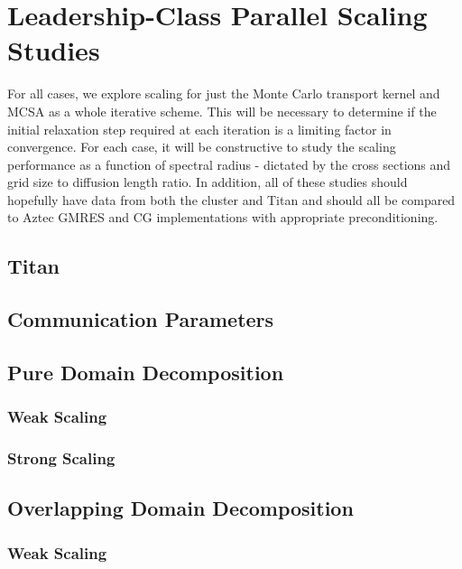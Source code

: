 \section{Leadership-Class Parallel Scaling Studies}
\label{sec:leadership_scaling_studies}
For all cases, we explore scaling for just the Monte Carlo transport
kernel and MCSA as a whole iterative scheme. This will be necessary to
determine if the initial relaxation step required at each iteration is
a limiting factor in convergence. For each case, it will be
constructive to study the scaling performance as a function of
spectral radius - dictated by the cross sections and grid size to
diffusion length ratio. In addition, all of these studies should
hopefully have data from both the cluster and Titan and should all be
compared to Aztec GMRES and CG implementations with appropriate
preconditioning.

\subsection{Titan}
\label{subsec:titan}

\subsection{Communication Parameters}
\label{subsec:comm_parameters}

\subsection{Pure Domain Decomposition}
\label{subsec:pure_domain_decomp}

\subsubsection{Weak Scaling}
\label{subsubsec:pure_weak}

\subsubsection{Strong Scaling}
\label{subsubsec:pure_strong}

\subsection{Overlapping Domain Decomposition}
\label{subsec:overlapping_domain_decomp}

\subsubsection{Weak Scaling}
\label{subsubsec:overlapping_weak}

